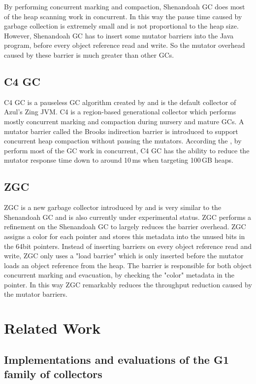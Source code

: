 By performing concurrent marking and compaction, Shenandoah GC does most of the
heap scanning work in concurrent. In this way the pause time caused by garbage collection
is extremely small and is not proportional to the heap size.
However, Shenandoah GC has to insert some mutator barriers into the Java program,
before every object reference read and write. So the mutator overhead caused by
these barrier is much greater than other GCs.

\subsection{C4 GC}

C4 GC is a pauseless GC algorithm created by \cite{tene2011c4} and is the default
collector of Azul's Zing JVM. C4 is a region-based generational collector which
performs mostly concurrent marking and compaction during nursery and mature GCs.
A mutator barrier called the Brooks indirection barrier is introduced to support
concurrent heap compaction without pausing the mutators. According the \cite{tene2011c4},
by perform most of the GC work in concurrent, C4 GC has the ability to reduce the
mutator response time down to around 10\,ms when targeting 100\,GB heaps.

\subsection{ZGC}

ZGC is a new garbage collector introduced by \cite{liden_karlsson_2018} and
is very similar to the Shenandoah GC and is also currently under experimental status.
ZGC performs a refinement on the Shenandoah GC to largely reduces the barrier
overhead.
ZGC assigns a color for each pointer and stores this metadata into the
unused bits in the 64bit pointers.
Instead of inserting barriers on every object reference read and write,
ZGC only uses a "load barrier" which is only inserted before the mutator loads an
object reference from the heap. The barrier is responsible for both object concurrent marking
and evacuation, by checking the "color" metadata in the pointer.
In this way ZGC remarkably reduces the throughput reduction caused by the mutator
barriers.

\section{Related Work}
\label{sec:relatedwork}

\subsection{Implementations and evaluations of the G1 family of collectors}

